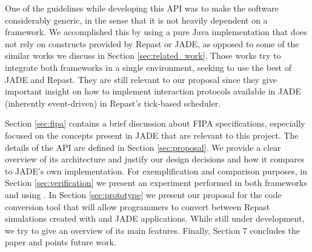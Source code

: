One of the guidelines while developing this API was to make the software considerably generic, in the sense that it is not heavily dependent on a framework.
We accomplished this by using a pure Java implementation that does not rely on constructs provided by Repast or \gls{JADE}, as opposed to some of the similar works we discuss in Section \ref{sec:related_work}.
Those works try to integrate both frameworks in a single environment, seeking to use the best of \gls{JADE} and Repast. They are still relevant to our proposal since they give important insight on how to implement interaction protocols available in \gls{JADE} (inherently event-driven) in Repast's tick-based scheduler.

Section \ref{sec:fipa} contains a brief discussion about FIPA specifications, especially focused on the concepts present in JADE that are relevant to this project.
The details of the API are defined in Section \ref{sec:proposal}. We provide a clear overview of its architecture and justify our design decisions and how it compares to \gls{JADE}'s own implementation.
For exemplification and comparison purposes, in Section \ref{sec:verification} we present an experiment performed in both frameworks and using \apiname{}.
In Section \ref{sec:prototype} we present our proposal for the code conversion tool that will allow programmers to convert between Repast simulations created with \apiname{} and \gls{JADE} applications. While still under development, we try to give an overview of its main features.
Finally, Section 7 concludes the paper and points future work.







